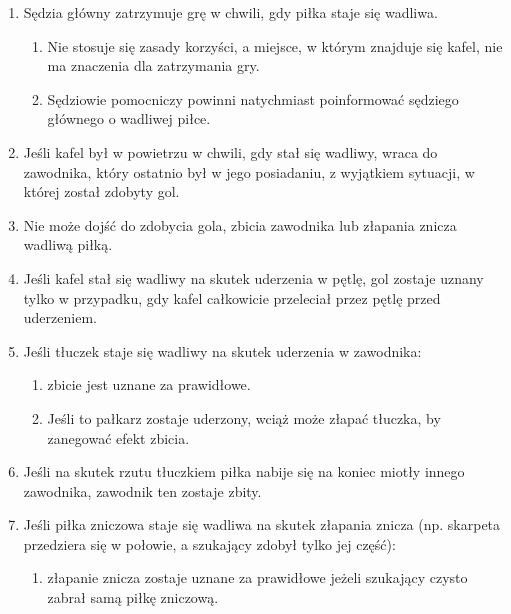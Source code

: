 \documentclass[12pt]{article}
\begin{document}
\begin{enumerate}
	\item Sędzia główny zatrzymuje grę w chwili, gdy piłka staje się wadliwa.

	      \begin{enumerate}
		      \item Nie stosuje się zasady korzyści, a miejsce, w którym znajduje się
		            kafel, nie ma znaczenia dla zatrzymania gry.

		      \item Sędziowie pomocniczy powinni natychmiast poinformować sędziego
		            głównego o wadliwej piłce.
	      \end{enumerate}

	\item Jeśli kafel był w powietrzu w chwili, gdy stał się wadliwy, wraca do
	      zawodnika, który ostatnio był w jego posiadaniu, z wyjątkiem sytuacji, w
	      której został zdobyty gol.

	\item Nie może dojść do zdobycia gola, zbicia zawodnika lub złapania znicza
	      wadliwą piłką.

	\item Jeśli kafel stał się wadliwy na skutek uderzenia w pętlę, gol zostaje
	      uznany tylko w przypadku, gdy kafel całkowicie przeleciał przez pętlę
	      przed uderzeniem.

	\item Jeśli tłuczek staje się wadliwy na skutek uderzenia w zawodnika:
	      \begin{enumerate}
		      \item zbicie jest uznane za prawidłowe.

		      \item Jeśli to pałkarz zostaje uderzony, wciąż może złapać tłuczka, by
		            zanegować efekt zbicia.
	      \end{enumerate}

	\item Jeśli na skutek rzutu tłuczkiem piłka nabije się na koniec miotły
	      innego zawodnika, zawodnik ten zostaje zbity.

	\item Jeśli piłka zniczowa staje się wadliwa na skutek złapania znicza (np.
	      skarpeta przedziera się w połowie, a szukający zdobył tylko jej część):
	      \begin{enumerate}
		      \item złapanie znicza zostaje uznane za prawidłowe jeżeli szukający czysto
		            zabrał samą piłkę zniczową.


\end{enumerate}
\end{enumerate}
\end{document}
